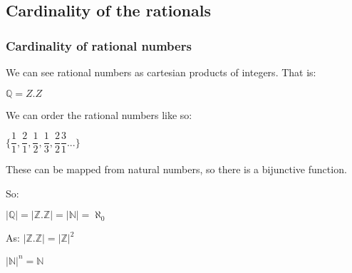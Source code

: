 \subsection{Cardinality of the rationals}

\subsubsection{Cardinality of rational numbers}

We can see rational numbers as cartesian products of integers. That is:

\(\mathbb{Q}=Z.Z\)

We can order the rational numbers like so:

\(\{\dfrac{1}{1},\dfrac{2}{1},\dfrac{1}{2},\dfrac{1}{3},\dfrac{2}{2}\dfrac{3}{1}...\}\)

These can be mapped from natural numbers, so there is a bijunctive function.

So:

\(|\mathbb{Q} |=|\mathbb{Z}.\mathbb{Z} |=|\mathbb{N} |=\aleph_0\)

As: \(|\mathbb{Z}.\mathbb{Z} |=|\mathbb{Z}|^2\)

\(|\mathbb{N}|^n=\mathbb{N}\)

